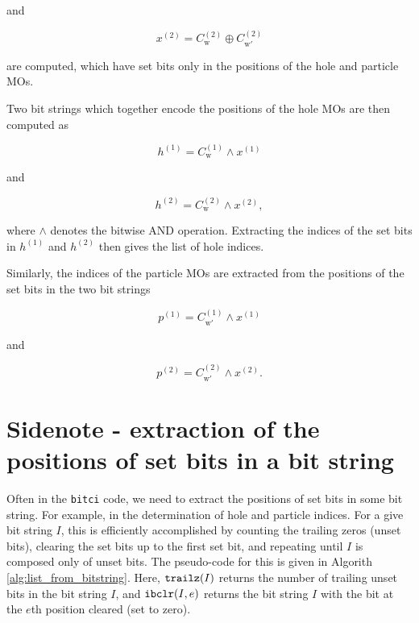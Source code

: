 \documentclass[12pt,a4paper]{report}
\newcommand*\code[1]{\mbox{\texttt{{#1}}}} %
\begin{document}
\noindent
and

\begin{equation}
  x^{(2)} = C_{\text{w}}^{(2)} \oplus C_{\text{w}'}^{(2)}
\end{equation}

\noindent
are computed, which have set bits only in the positions of the hole
and particle MOs.

Two bit strings which together encode the positions of the hole MOs
are then computed as

\begin{equation}
  h^{(1)} = C_{\text{w}}^{(1)} \wedge x^{(1)}
\end{equation}

\noindent
and

\begin{equation}
  h^{(2)} = C_{\text{w}}^{(2)} \wedge x^{(2)},
\end{equation}

\noindent
where $\wedge$ denotes the bitwise AND operation. Extracting the
indices of the set bits in $h^{(1)}$ and $h^{(2)}$ then gives the list
of hole indices.

Similarly, the indices of the particle MOs are extracted from the
positions of the set bits in the two bit strings

\begin{equation}
  p^{(1)} = C_{\text{w}'}^{(1)} \wedge x^{(1)}
\end{equation}

\noindent
and

\begin{equation}
  p^{(2)} = C_{\text{w}'}^{(2)} \wedge x^{(2)}.
\end{equation}

\section{Sidenote - extraction of the positions of set bits in a bit string}
Often in the \code{bitci} code, we need to extract the positions of
set bits in some bit string. For example, in the determination of hole
and particle indices. For a give bit string $I$, this is efficiently
accomplished by counting the trailing zeros (unset bits), clearing the
set bits up to the first set bit, and repeating until $I$ is composed
only of unset bits. The pseudo-code for this is given in Algorith
\ref{alg:list_from_bitstring}. Here, $\code{trailz}(I)$ returns the
number of trailing unset bits in the bit string $I$, and
$\code{ibclr}(I,e)$ returns the bit string $I$ with the bit at the
$e$th position cleared (set to zero).
\end{document}
